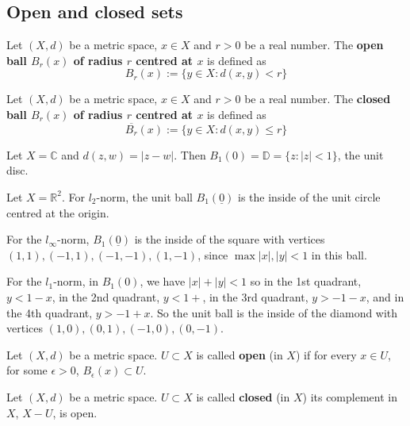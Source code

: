 \subsection{Open and closed sets}

\begin{definition}
	Let $(X, d)$ be a metric space, $x \in X$ and $r > 0$ be a real number. The \textbf{open ball $B_r(x)$ of radius $r$ centred at $x$} is defined as
	\[
		B_r(x) := \{y \in X: d(x, y) < r\}
	\]
\end{definition}

\begin{definition}
	Let $(X, d)$ be a metric space, $x \in X$ and $r > 0$ be a real number. The \textbf{closed ball $B_r(x)$ of radius $r$ centred at $x$} is defined as
	\[
		\overline{B_r}(x) := \{y \in X: d(x, y) \le r\}
	\]
\end{definition}

\begin{example}
	Let $X = \mathbb{C}$ and $d(z, w) = |z - w|$. Then $B_1(0) = \mathbb{D} = \{ z: |z| < 1 \}$, the unit disc.
\end{example}

\begin{example}
	Let $X = \mathbb{R}^2$. For $l_2$-norm, the unit ball $B_1(\underline{0})$ is the inside of the unit circle centred at the origin.

	For the $l_{\infty}$-norm, $B_1(\underline{0})$ is the inside of the square with vertices $(1, 1), (-1, 1), (-1, -1), (1, -1)$, since $\max{ |x|, |y| } < 1$ in this ball.

	For the $l_1$-norm, in $B_1(0)$, we have $|x| + |y| < 1$ so in the 1st quadrant, $y < 1 - x$, in the 2nd quadrant, $y < 1 + $, in the 3rd quadrant, $y > -1 - x$, and in the 4th quadrant, $y > -1 + x$. So the unit ball is the inside of the diamond with vertices $(1, 0), (0, 1), (-1, 0), (0, -1)$.
\end{example}

\begin{definition}
	Let $(X, d)$ be a metric space. $U \subset X$ is called \textbf{open} (in $X$) if for every $x \in U$, for some $\epsilon > 0$, $B_{\epsilon}(x) \subset U$.
\end{definition}

\begin{definition}
	Let $(X, d)$ be a metric space. $U \subset X$ is called \textbf{closed} (in $X$) its complement in $X$, $X - U$, is open.
\end{definition}


